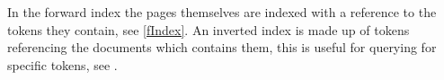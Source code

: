 In the forward index the pages themselves are indexed with a reference to the
tokens they contain, see \autoref{fIndex}. An inverted index is made up of
tokens referencing the documents which contains them, this is useful for
querying for specific tokens, see \citep{Index3}.






% 
% 
% 
% 
